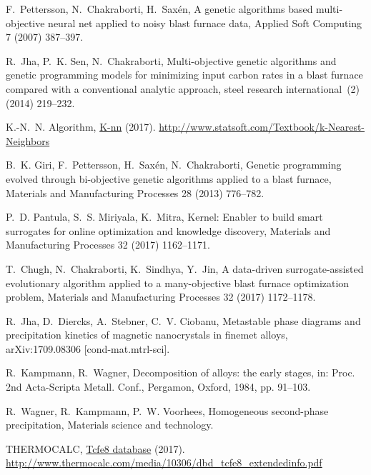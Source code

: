 \begin{thebibliography}{10}
F.~Pettersson, N.~Chakraborti, H.~Sax{\'e}n, A genetic algorithms based
  multi-objective neural net applied to noisy blast furnace data, Applied Soft
  Computing 7 (2007) 387--397.

R.~Jha, P.~K. Sen, N.~Chakraborti, Multi-objective genetic algorithms and
  genetic programming models for minimizing input carbon rates in a blast
  furnace compared with a conventional analytic approach, steel research
  international~(2) (2014) 219--232.

K.-N.~N. Algorithm,
  \href{http://www.statsoft.com/Textbook/k-Nearest-Neighbors}{K-nn} (2017).
\newline\urlprefix\url{http://www.statsoft.com/Textbook/k-Nearest-Neighbors}

B.~K. Giri, F.~Pettersson, H.~Sax{\'e}n, N.~Chakraborti, Genetic programming
  evolved through bi-objective genetic algorithms applied to a blast furnace,
  Materials and Manufacturing Processes 28 (2013) 776--782.

P.~D. Pantula, S.~S. Miriyala, K.~Mitra, Kernel: Enabler to build smart
  surrogates for online optimization and knowledge discovery, Materials and
  Manufacturing Processes 32 (2017) 1162--1171.

T.~Chugh, N.~Chakraborti, K.~Sindhya, Y.~Jin, A data-driven surrogate-assisted
  evolutionary algorithm applied to a many-objective blast furnace optimization
  problem, Materials and Manufacturing Processes 32 (2017) 1172--1178.

R.~Jha, D.~Diercks, A.~Stebner, C.~V. Ciobanu, Metastable phase diagrams and
  precipitation kinetics of magnetic nanocrystals in finemet alloys,
  arXiv:1709.08306 [cond-mat.mtrl-sci].

R.~Kampmann, R.~Wagner, Decomposition of alloys: the early stages, in: Proc.
  2nd Acta-Scripta Metall. Conf., Pergamon, Oxford, 1984, pp. 91--103.

R.~Wagner, R.~Kampmann, P.~W. Voorhees, Homogeneous second-phase precipitation,
  Materials science and technology.

THERMOCALC,
  \href{http://www.thermocalc.com/media/10306/dbd_tcfe8_extendedinfo.pdf}{Tcfe8
  database} (2017).
\newline\urlprefix\url{http://www.thermocalc.com/media/10306/dbd_tcfe8_extendedinfo.pdf}


\end{thebibliography}
